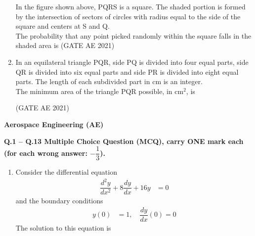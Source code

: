 \documentclass[journal,12pt,onecolumn]{IEEEtran}
\theoremstyle{remark}
\begin{document}
\begin{flushleft}
\begin{enumerate}
In the figure shown above, PQRS is a square. The shaded portion is formed by the intersection of sectors of circles with radius equal to the side of the square and centers at S and Q. \\

The probability that any point picked randomly within the square falls in the shaded area is \underline{\hspace{2cm}}
\hfill (GATE AE 2021)
\begin{enumerate}
\end{enumerate}
\item 
In an equilateral triangle PQR, side PQ is divided into four equal parts, side QR is divided into six equal parts and side PR is divided into eight equal parts. The length of each subdivided part in cm is an integer. \\

The minimum area of the triangle PQR possible, in cm$^2$, is \underline{\hspace{2cm}}

\hfill (GATE AE 2021)

\begin{enumerate}
\end{enumerate}
\end{enumerate}

\begin{center}
\textbf{Aerospace Engineering (AE)}
\end{center}

\textbf{ Q.1 -- Q.13 Multiple Choice Question (MCQ), carry ONE mark each (for each wrong answer: $-\dfrac{1}{3}$).}

\begin{enumerate}
\item Consider the differential equation
\begin{align*}
\dfrac{d^2 y}{dx^2} + 8\dfrac{dy}{dx} + 16y &= 0
\end{align*}
and the boundary conditions
\begin{align*}
y(0) &= 1, \quad \dfrac{dy}{dx}(0) = 0
\end{align*}
The solution to this equation is


\end{enumerate}
\end{flushleft}
\end{document}
